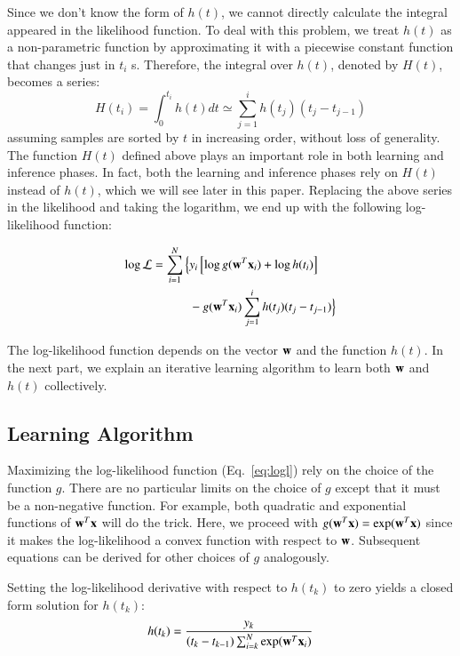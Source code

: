 Since we don't know the form of $h(t)$, we cannot directly calculate the integral appeared in the likelihood function. To deal with this problem, we treat $h(t)$ as a non-parametric function by approximating it with a piecewise constant function that changes just in $t_i$ s. Therefore, the integral over $h(t)$, denoted by $H(t)$, becomes a series:
\begin{equation}\label{eq:cumh}
H(t_i)=\int_{0}^{t_i}h(t)dt \simeq \sum_{j=1}^{i}h(t_j)(t_j-t_{j-1})
\end{equation}
assuming samples are sorted by $t$ in increasing order, without loss of generality. The function $H(t)$ defined above plays an important role in both learning and inference phases. In fact, both the learning and inference phases rely on $H(t)$ instead of $h(t)$, which we will see later in this paper.
Replacing the above series in the likelihood and taking the logarithm, we end up with the following log-likelihood function:

\begin{equation}\label{eq:logl}
\begin{split}
\log\mathcal{L}
=\sum_{i=1}^{N}\Big\lbrace& y_i\left[\log g(\mb{w}^T\mb{x}_i) + \log h(t_i)\right]\\&-g(\mb{w}^T\mb{x}_i)\sum_{j=1}^{i}h(t_j)(t_j-t_{j-1})\Big\rbrace\\
\end{split}
\end{equation}

The log-likelihood function depends on the vector $\mathbf{w}$ and the function $h(t)$. In the next part, we explain an iterative learning algorithm to learn both $\mathbf{w}$ and $h(t)$ collectively.

\subsection{Learning Algorithm}
Maximizing the log-likelihood function (Eq.~\ref{eq:logl}) rely on the choice of the function $g$. There are no particular limits on the choice of $g$ except that it must be a non-negative function. For example, both quadratic and exponential functions of $\mathbf{w}^T\mathbf{x}$ will do the trick. Here, we proceed with $g(\mathbf{w}^T\mathbf{x})=\exp(\mathbf{w}^T\mathbf{x})$ since it makes the log-likelihood a convex function with respect to $\mathbf{w}$. Subsequent equations can be derived for other choices of $g$ analogously.

Setting the log-likelihood derivative with respect to $h(t_k)$ to zero yields a closed form solution for $h(t_k)$:
\begin{equation}\label{eq:h}
h(t_k)=\frac{y_k}{(t_k-t_{k-1})\sum_{i=k}^{N}\exp(\mb{w}^T\mb{x}_i)}
\end{equation}

